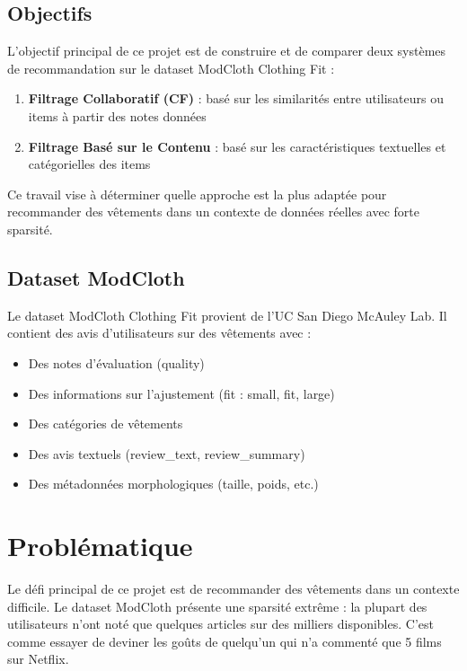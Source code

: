 \documentclass[12pt,a4paper]{article}
\begin{document}
\subsection{Objectifs}

L'objectif principal de ce projet est de construire et de comparer deux systèmes de recommandation sur le dataset ModCloth Clothing Fit :

\begin{enumerate}
    \item \textbf{Filtrage Collaboratif (CF)} : basé sur les similarités entre utilisateurs ou items à partir des notes données
    \item \textbf{Filtrage Basé sur le Contenu} : basé sur les caractéristiques textuelles et catégorielles des items
\end{enumerate}

Ce travail vise à déterminer quelle approche est la plus adaptée pour recommander des vêtements dans un contexte de données réelles avec forte sparsité.

\subsection{Dataset ModCloth}

Le dataset ModCloth Clothing Fit provient de l'UC San Diego McAuley Lab. Il contient des avis d'utilisateurs sur des vêtements avec :
\begin{itemize}
    \item Des notes d'évaluation (quality)
    \item Des informations sur l'ajustement (fit : small, fit, large)
    \item Des catégories de vêtements
    \item Des avis textuels (review\_text, review\_summary)
    \item Des métadonnées morphologiques (taille, poids, etc.)
\end{itemize}

\section{Problématique}

Le défi principal de ce projet est de recommander des vêtements dans un contexte difficile. Le dataset ModCloth présente une sparsité extrême : la plupart des utilisateurs n'ont noté que quelques articles sur des milliers disponibles. C'est comme essayer de deviner les goûts de quelqu'un qui n'a commenté que 5 films sur Netflix.
\end{document}
